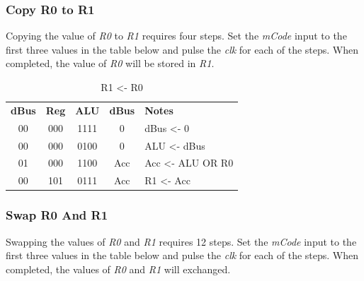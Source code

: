 \subsubsection{Copy R0 to R1}

Copying the value of \textit{R0} to \textit{R1} requires four steps. Set the \textit{mCode} input to the first three values in the table below and pulse the \textit{clk} for each of the steps. When completed, the value of \textit{R0} will be stored in \textit{R1}.

\begin{table}[H]
	\sffamily
	\newcommand{\head}[1]{\textcolor{white}{\textbf{#1}}}		
	\begin{center}
		\begin{tabular}{ccccl} 
			\textbf{dBus} & \textbf{Reg} & \textbf{ALU} & \textbf{dBus} & \textbf{Notes} \\
			00 & 000 & 1111 & 0 & dBus <- 0 \\
			00 & 000 & 0100 & 0 & ALU <- dBus \\
			01 & 000 & 1100 & Acc & Acc <- ALU OR R0 \\
			00 & 101 & 0111 & Acc & R1 <- Acc
		\end{tabular}
	\end{center}
	\caption{R1 <- R0}
	\label{tab:11-07}
\end{table}

\subsubsection{Swap R0 And R1}

Swapping the values of \textit{R0} and \textit{R1} requires 12 steps. Set the \textit{mCode} input to the first three values in the table below and pulse the \textit{clk} for each of the steps. When completed, the values of \textit{R0} and \textit{R1} will exchanged.

